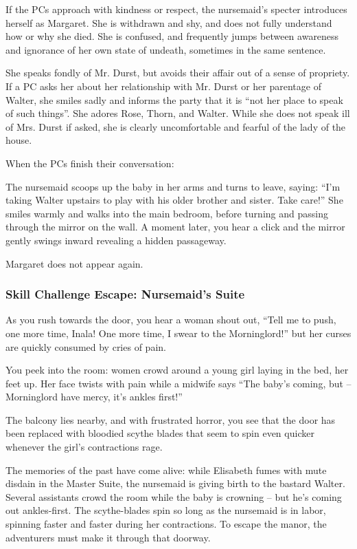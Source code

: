 If the PCs approach with kindness or respect, the nursemaid's specter introduces herself as Margaret. She
is withdrawn and shy, and does not fully understand how or why she died. She is confused, and frequently
jumps between awareness and ignorance of her own state of undeath, sometimes in the same sentence.

She speaks fondly of Mr. Durst, but avoids their affair out of a sense of propriety. If a PC asks her about
her relationship with Mr. Durst or her parentage of Walter, she smiles sadly and informs the party that it
is ``not her place to speak of such things''. She adores Rose, Thorn, and Walter. While she does not speak
ill of Mrs. Durst if asked, she is clearly uncomfortable and fearful of the lady of the house.

When the PCs finish their conversation:
\begin{readout}
  The nursemaid scoops up the baby in her arms and turns to leave, saying: ``I'm taking Walter upstairs to
  play with his older brother and sister. Take care!'' She smiles warmly and walks into the main bedroom,
  before turning and passing through the mirror on the wall. A moment later, you hear a click and the mirror
  gently swings inward revealing a hidden passageway.
\end{readout}
Margaret does not appear again.

\begin{arealinks}
\end{arealinks}

\subsubsection*{Skill Challenge Escape: Nursemaid's Suite}
\label{sec:SC_NursemaidsSuite}
\begin{readout}
  As you rush towards the door, you hear a woman shout out, ``Tell me to push, one more time, Inala! One more
  time, I swear to the Morninglord!'' but her curses are quickly consumed by cries of pain.
  
  You peek into the room: women crowd around a young girl laying in the bed, her feet up. Her face twists with
  pain while a midwife says ``The baby's coming, but -- Morninglord have mercy, it's ankles first!''
  
  The balcony lies nearby, and with frustrated horror, you see that the door has been replaced with bloodied 
  scythe blades that seem to spin even quicker whenever the girl's contractions rage.
\end{readout}
The memories of the past have come alive: while Elisabeth fumes with mute disdain in the Master Suite, the
nursemaid is giving birth to the bastard Walter. Several assistants crowd the room while the baby is crowning --
but he's coming out ankles-first. The scythe-blades spin so long as the nursemaid is in labor, spinning faster
and faster during her contractions. To escape the manor, the adventurers must make it through that doorway.

